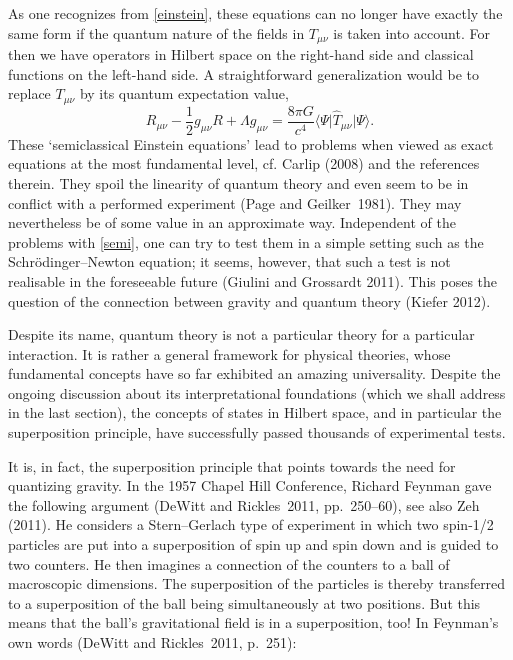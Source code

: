 \documentclass[12pt]{article}
\newcommand{\be}{\begin{equation}}
\newcommand{\ee}{\end{equation}}
\newcommand{\lb}{\label}
\begin{document}
As one recognizes from \eqref{einstein}, these equations can no longer
have exactly the same form if the quantum nature of the fields in
$T_{\mu\nu}$ is taken into account. For then we have operators in
Hilbert space on the right-hand side and classical functions on the
left-hand side. A straightforward generalization would be to replace
$T_{\mu\nu}$ by its quantum expectation value, 
\be
\lb{semi}
R_{\mu\nu}-\frac{1}{2}g_{\mu\nu}R+\Lambda g_{\mu\nu}=
  \frac{8\pi G}{c^4}\langle\Psi\vert\hat{T}_{\mu\nu}
\vert\Psi\rangle .
\ee
These `semiclassical Einstein equations' lead to problems when viewed
as exact equations at the most fundamental level,
cf. Carlip (2008) and the references therein. They spoil the linearity of
quantum theory and even seem to be in
conflict with a performed experiment (Page and Geilker~1981). They
may nevertheless be of some value in an approximate way. Independent
of the problems with \eqref{semi}, one can try to test them in a
simple setting such as the Schr\"odinger--Newton equation; it seems,
however, that such a test is not realisable in the foreseeable future
(Giulini and Grossardt 2011). 
This poses the question of the
connection between gravity and quantum theory (Kiefer 2012).

Despite its name, quantum theory is not a particular theory for a
particular interaction. It is rather a general framework for physical
theories, whose fundamental concepts have so far exhibited an amazing
universality. Despite the ongoing discussion about its
interpretational foundations (which we shall address in the last
section), the concepts of states in Hilbert space, and in particular
the superposition principle, have successfully passed thousands of
experimental tests.

It is, in fact, the superposition principle that points towards the
need for quantizing gravity. In the 1957 Chapel Hill Conference,
Richard Feynman gave the following argument (DeWitt and Rickles~2011,
pp.~250--60), see also Zeh (2011). He considers a Stern--Gerlach type
of experiment in 
which two spin-1/2 particles are put into a superposition of spin up
and spin down and is guided to two counters. He then imagines a connection of
the counters to a ball of macroscopic dimensions. The superposition of
the particles is thereby transferred to a superposition of the ball
being simultaneously at two positions. But this means that the ball's
gravitational field is in a superposition, too! In Feynman's own words
(DeWitt and Rickles~2011, p.~251):
\end{document}
